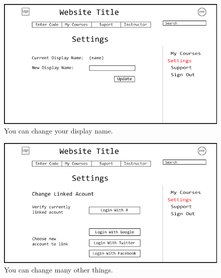 \documentclass{article}
\begin{document}
\begin{figure}[h!]
    \caption{You can change your display name.}
    \includegraphics[width=\textwidth]{user_settings_page_display_name}
\end{figure}
\begin{figure}[h!]
    \caption{You can change many other things.}
    \includegraphics[width=\textwidth]{user_settings_page_change_account}
\end{figure}

\newpage
\end{document}
